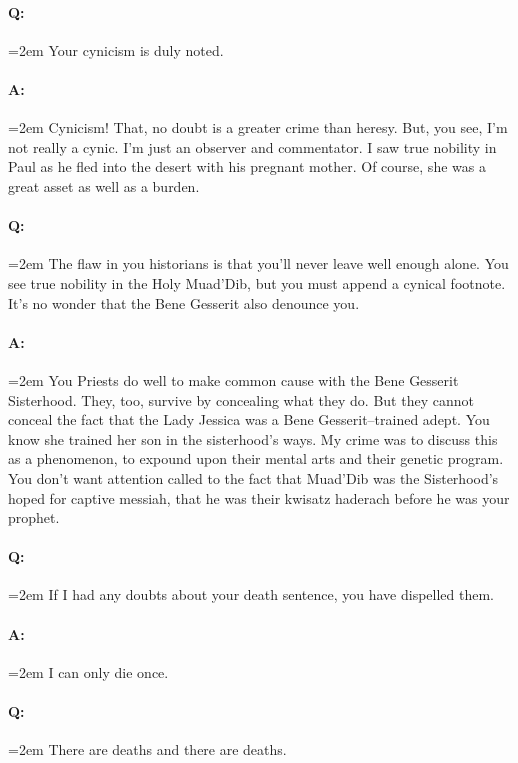\documentclass[a4paper, 12pt, oldfontcommands, final]{memoir}
\begin{document}
\paragraph{Q:} \hangindent=2em Your cynicism is duly noted.
\paragraph{A:} \hangindent=2em Cynicism! That, no doubt is a greater crime than heresy. But, you see, I'm not really a cynic. I'm just an observer and commentator. I saw true nobility in Paul as he fled into the desert with his pregnant mother. Of course, she was a great asset as well as a burden.
\paragraph{Q:} \hangindent=2em The flaw in you historians is that you'll never leave well enough alone. You see true nobility in the Holy Muad'Dib, but you must append a cynical footnote. It's no wonder that the Bene Gesserit also denounce you.
\paragraph{A:} \hangindent=2em You Priests do well to make common cause with the Bene Gesserit Sisterhood. They, too, survive by concealing what they do. But they cannot conceal the fact that the Lady Jessica was a Bene Gesserit–trained adept. You know she trained her son in the sisterhood's ways. My crime was to discuss this as a phenomenon, to expound upon their mental arts and their genetic program. You don't want attention called to the fact that Muad'Dib was the Sisterhood's hoped for captive messiah, that he was their kwisatz haderach before he was your prophet.
\paragraph{Q:} \hangindent=2em If I had any doubts about your death sentence, you have dispelled them.
\paragraph{A:} \hangindent=2em I can only die once.
\paragraph{Q:} \hangindent=2em There are deaths and there are deaths.
\end{document}
